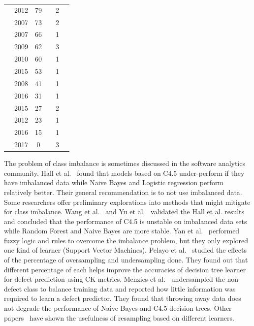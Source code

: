 \documentclass[sigconf]{acmart}
\newcommand{\cmark}{\ding{51}}%
\newcommand{\xmark}{\ding{55}}%
\theoremstyle{break}
\begin{document}
\begin{table}[!t]
\begin{tabular}{c|c|c|c|c|c}
        \cite{li2012sample} & 2012 & 79 & \cmark & 2 & \xmark  \\ 
        \cite{kamei2007effects} & 2007 & 73 & \xmark & 2 & \cmark\\  
        \cite{pelayo2007applying} & 2007 & 66 & \xmark & 1 & \cmark \\  
        \cite{jiang2009variance} & 2009 & 62 & \cmark & 3 & \xmark  \\ 
        \cite{khoshgoftaar2010attribute} & 2010 & 60 & \cmark & 1 & \cmark  \\  
        \cite{ghotra2015revisiting} & 2015 & 53 & \cmark & 1 & \xmark  \\  
        \cite{jiang2008can} & 2008 & 41 & \cmark & 1 & \xmark  \\  
         \cite{tantithamthavorn2016automated} & 2016 & 31 & \cmark & 1 & \xmark  \\ 
        \cite{tan2015online} & 2015 & 27 & \xmark & 2 & \cmark \\  
        \cite{pelayo2012evaluating} & 2012 & 23 & \xmark & 1 & \cmark \\  
        \cite{fu2016tuning} & 2016 & 15 & \cmark & 1 & \xmark  \\  
        \cite{bennin2017mahakil} & 2017 & 0 & \cmark & 3 & \cmark \\
\end{tabular}
\vspace{-0.3cm}
\end{table}
 
The problem of class imbalance is sometimes discussed in the software analytics community.
Hall et al.~\cite{hall2012systematic} found that models based on C4.5 under-perform if they have imbalanced data while Naive Bayes and Logistic regression perform relatively better. 
Their general recommendation is to not use
imbalanced data.  
Some researchers offer preliminary explorations into methods that might mitigate for class imbalance.
Wang et al.~\cite{wang2013using} and Yu et al.~\cite{yu2017performance} validated the Hall et al. results and concluded that the
performance of C4.5 is unstable on imbalanced data sets while  Random Forest and Naive Bayes are 
more stable. 
Yan et al.~\cite{yan2010software} performed fuzzy logic and rules to overcome the imbalance problem, but they only
explored one kind of learner (Support Vector Machines).
Pelayo et al.~\cite{pelayo2007applying} studied the effects of the percentage of oversampling and undersampling done. They found out that different percentage of each helps improve the accuracies of decision tree learner for defect prediction using CK metrics. Menzies et al.~\cite{menzies2008implications} undersampled the non-defect class to balance training
data and reported how little information was required to learn a defect predictor. They found that throwing away data does not degrade the performance of Naive Bayes and C4.5 decision trees. Other papers~\cite{pelayo2007applying, pelayo2012evaluating, riquelme2008finding} have shown the usefulness of resampling based on different learners.
\end{document}
